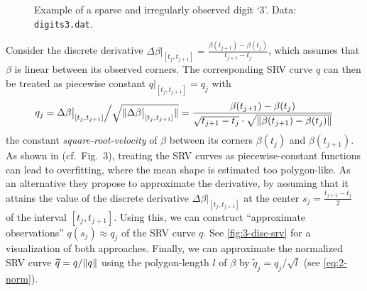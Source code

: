 \begin{figure}
  \centering
  \begin{subfigure}{.48\textwidth}
    \centering
  \end{subfigure}\hfill%
  \begin{subfigure}{.48\textwidth}
    \centering
    \begin{subfigure}{\textwidth}
      \centering
    \end{subfigure}
    \begin{subfigure}{\textwidth}
      \centering
    \end{subfigure}
  \end{subfigure}
  \caption{Example of a sparse and irregularly observed digit \enquote*{3}. Data: \texttt{digits3.dat}.}
  \label{fig:3-disc}
\end{figure}

Consider the discrete derivative $\Delta \beta \big\rvert_{[t_j, t_{j+1}]} = \frac{\beta(t_{j+1}) - \beta(t_{j})}{t_{j+1} - t_j}$, which assumes that $\beta$ is linear between its observed corners. 
The corresponding SRV curve $q$ can then be treated as piecewise constant $q\big\rvert_{[t_{j},t_{j+1}]} = q_j$ with 
\begin{equation}
  q_j = \Delta \beta \big\rvert_{[t_j, t_{j+1}]} \Big/ \sqrt{\lVert\Delta \beta \big\rvert_{[t_j, t_{j+1}]}\rVert} = \frac{\beta(t_{j+1}) - \beta(t_j)}{\sqrt{t_{j+1} - t_j} \cdot \sqrt{\lVert\beta(t_{j+1}) - \beta(t_j)\rVert}}
\end{equation}
the constant \emph{square-root-velocity} of $\beta$ between its corners $\beta(t_j)$ and $\beta(t_{j+1})$.
As shown in \cite{Steyer2021} (cf.\ Fig.\ 3), treating the SRV curves as piecewise-constant functions can lead to overfitting, where the mean shape is estimated too polygon-like.
As an alternative they  propose to approximate the derivative, by assuming that it attains the value of the discrete derivative $\Delta \beta \big\rvert_{[t_j,t_{j+1}]}$ at the center $s_j = \frac{t_{j+1} - t_j}{2}$ of the interval $[t_j, t_{j+1}]$.
Using this, we can construct \enquote{approximate observations} $q(s_j) \approx q_j$ of the SRV curve $q$.
See \cref{fig:3-disc-srv} for a visualization of both approaches.
Finally, we can approximate the normalized SRV curve $\widetilde q = q / \lVert q\rVert$ using the polygon-length $l$ of $\beta$ by $\widetilde q_j = q_j \big/ \sqrt{l}$ (see \cref{eq:2-norm}).

